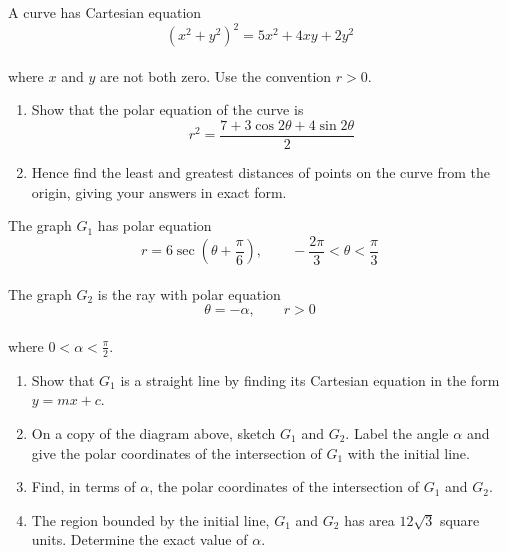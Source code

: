 \documentclass[leqno]{article}
\begin{document}
\begin{enumerate}[
  label=\textbf{\arabic*.},
  leftmargin=*,
  topsep=0pt,
  partopsep=0pt,
  parsep=0pt
]
\newpage

\questionitem

A curve has Cartesian equation
\[
(x^2+y^2)^2=5x^2+4xy+2y^2
\] \\
where $x$ and $y$ are not both zero. Use the convention $r>0$. \\
\begin{enumerate}[label=\textbf{(\roman*)}]
\item Show that the polar equation of the curve is
\[
r^2=\frac{7+3\cos 2\theta+4\sin 2\theta}{2}
\] 
\item Hence find the least and greatest distances of points on the curve from the origin, giving your answers in exact form.  \\
\end{enumerate}

\newpage

\questionitem

\begin{figure}[H]
    \centering
{}
\end{figure}


The graph $G_1$ has polar equation
\[
r=6\sec\left(\theta+\frac{\pi}{6}\right),\qquad -\frac{2\pi}{3}<\theta<\frac{\pi}{3}
\] \\
The graph $G_2$ is the ray with polar equation
\[
\theta=-\alpha,\qquad r>0
\] \\
where $0<\alpha<\frac{\pi}{2}$. \\
\begin{enumerate}[label=\textbf{(\alph*)}]
\item Show that $G_1$ is a straight line by finding its Cartesian equation in the form $y=mx+c$.  \\
\item On a copy of the diagram above, sketch $G_1$ and $G_2$. Label the angle $\alpha$ and give the polar coordinates of the intersection of $G_1$ with the initial line.  \\
\item Find, in terms of $\alpha$, the polar coordinates of the intersection of $G_1$ and $G_2$.  \\
\item The region bounded by the initial line, $G_1$ and $G_2$ has area $12\sqrt{3}$ square units. Determine the exact value of $\alpha$.  \\
\end{enumerate}


\end{enumerate}
\end{document}
